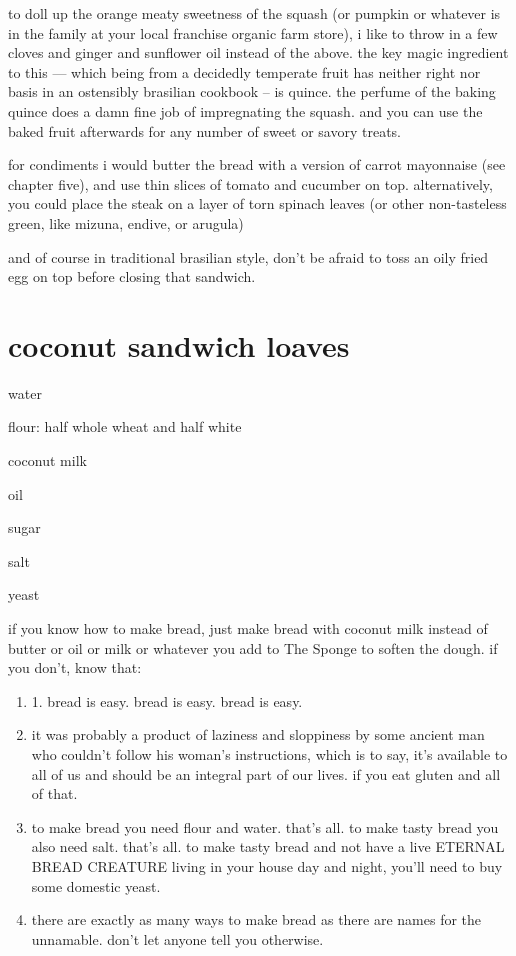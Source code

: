 to doll up the orange meaty sweetness of the squash (or pumpkin or
whatever is in the family at your local franchise organic farm store),
i like to throw in a few cloves and ginger and sunflower oil instead
of the above. the key magic ingredient to this --- which being from a
decidedly temperate fruit has neither right nor basis in an ostensibly
brasilian cookbook -- is quince. the perfume of the baking quince does
a damn fine job of impregnating the squash. and you can use the baked
fruit afterwards for any number of sweet or savory treats.

for condiments i would butter the bread with a version of carrot
mayonnaise (see chapter five), and use thin slices of tomato and
cucumber on top. alternatively, you could place the steak on a layer
of torn spinach leaves (or other non-tasteless green, like mizuna,
endive, or arugula)

and of course in traditional brasilian style, don't be afraid to toss
an oily fried egg on top before closing that sandwich.

\section{coconut sandwich loaves}

\begin{ingredients}
  \item water
  \item flour: half whole wheat and half white
  \item coconut milk
  \item oil
  \item sugar
  \item salt
  \item yeast
\end{ingredients}

if you know how to make bread, just make bread with coconut milk
instead of butter or oil or milk or whatever you add to The Sponge to
soften the dough. if you don't, know that:

\begin{enumerate}

  \item 1. bread is easy. bread is easy. bread is easy.

  \item it was probably a product of laziness and sloppiness by some
  ancient man who couldn't follow his woman's instructions,
  which is to say, it's available to all of us and should be an
  integral part of our lives. if you eat gluten and all of that.

  \item to make bread you need flour and water. that's all. to make
  tasty bread you also need salt. that's all. to make tasty bread
  and not have a live ETERNAL BREAD CREATURE living in your house day
  and night, you'll need to buy some domestic yeast.

  \item there are exactly as many ways to make bread as there are
  names for the unnamable. don't let anyone tell you otherwise.

\end{enumerate}

